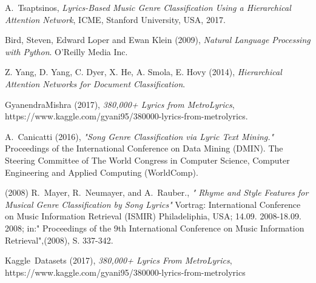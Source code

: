 \documentclass[journal]{IEEEtran}
\begin{document}

\begin{thebibliography}{6}

A.~Tsaptsinos, \emph{Lyrics-Based Music Genre Classification Using a Hierarchical Attention Network}, \relax ICME, Stanford University, USA, 2017.

Bird, Steven, Edward Loper and Ewan Klein (2009), \emph{Natural Language Processing with Python}. \relax O'Reilly Media Inc.

Z. Yang, D. Yang, C. Dyer, X. He, A. Smola, E. Hovy (2014), \emph{Hierarchical Attention Networks for Document Classification}.

GyanendraMishra (2017), \emph{380,000+ Lyrics from MetroLyrics}, https://www.kaggle.com/gyani95/380000-lyrics-from-metrolyrics.

A.~Canicatti (2016), \emph{ "Song Genre Classification via Lyric Text Mining."} \relax Proceedings of the International Conference on Data Mining (DMIN). The Steering Committee of The World Congress in Computer Science, Computer Engineering and Applied Computing (WorldComp).

 (2008) R.~Mayer, R.~Neumayer, and A.~Rauber., \emph{" Rhyme and Style Features for Musical Genre Classification by Song Lyrics"} \relax Vortrag: International Conference on Music Information Retrieval (ISMIR) Philadeliphia, USA; 14.09. 2008-18.09. 2008; in:" Proceedings of the 9th International Conference on Music Information Retrieval",(2008), S. 337-342.

 Kaggle~Datasets (2017), \emph{380,000+ Lyrics From MetroLyrics}, \relax https://www.kaggle.com/gyani95/380000-lyrics-from-metrolyrics

\end{thebibliography}

\end{document}
